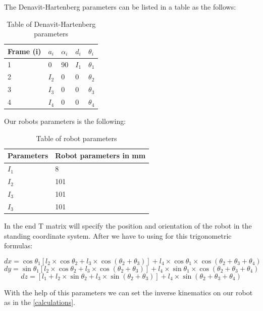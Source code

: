 			
		The Denavit-Hartenberg parameters can be listed in a table as the follows:
		
			\begin{table}[h]
				\centering
				\begin{tabular}{|l|l|l|l|l|}
				\hline
				Frame (i) & $a_i$ & $\alpha _i$ & $d_i$ & $\theta _i$ \\ \hline
				1				&   0   &  90 & $I_1$ & $\theta _1$ \\ \hline
				2				&   $I_2$   &   0  & 0 & $\theta _2$ \\ \hline
				3				&   $I_3$   &   0  & 0 & $\theta _3$ \\ \hline
				4				&   $I_4$   &   0  & 0 & $\theta _4$ \\ \hline
				\end{tabular}
				\caption{Table of Denavit-Hartenberg parameters}
			\end{table}
			
			Our robots parameters is the following:
		
			\begin{table}[h]
				\centering
				\begin{tabular}{|l|l|}
				\hline
				Parameters & Robot parameters in mm \\ \hline
				$I_1$					 &       8                 \\ \hline
				$I_2$					 &       101                 \\ \hline
				$I_3$					 &       101                 \\ \hline
				$I_3$					 &       101                 \\ \hline
				\end{tabular}
				\caption{Table of robot parameters}
			\end{table}	
			
		In the end T matrix will specify the position and orientation of the robot in the standing coordinate system.
		After we have to using for this trigonometric formulas:
	
		\hspace{15pt}\[ dx = \cos\theta _1[l_2\times \cos \theta _2 + l_3\times \cos(\theta _2 + \theta _3)] + l_4\times \cos \theta _1 \times \cos(\theta _2 + \theta _3 + \theta _4) \]
		\hspace{15pt}\[ dy = \sin\theta _1[l_2\times \cos \theta _2 + l_3\times \cos(\theta _2 + \theta _3)] + l_4\times \sin \theta _1 \times \cos(\theta _2 + \theta _3 + \theta _4) \]
		\hspace{15pt}\[ dz = [l_1 + l_2\times \sin \theta _2 + l_3\times \sin(\theta _2 + \theta _3)] + l_4\times \sin(\theta _2 + \theta _3 + \theta _4) \]
		
		With the help of this parameters we can set the inverse kinematics on our robot as in the \ref{calculations}.
		
		
